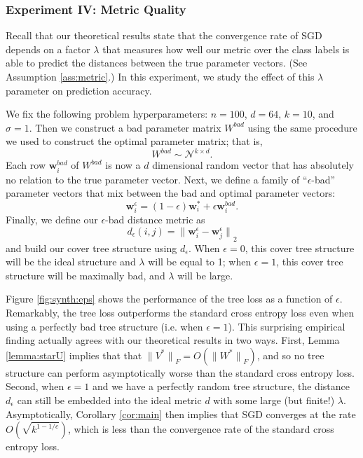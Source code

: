 \documentclass[twoside]{article}
\renewcommand{\star}[1]{{#1}^{*}}
\newcommand{\bad}[1]{{#1}^{\textit{bad}}}
\newcommand{\w}{\mathbf w}
\newcommand{\ltwo}[1]{{\lVert {#1} \rVert}_2}
\newcommand{\lF}[1]{{\lVert {#1} \rVert}_F}
\begin{document}
\subsubsection{Experiment IV: Metric Quality}
\label{sec:synth:eps}

Recall that our theoretical results state that the convergence rate of SGD depends on a factor $\lambda$ that measures how well our metric over the class labels is able to predict the distances between the true parameter vectors.
(See Assumption \ref{ass:metric}.)
In this experiment, we study the effect of this $\lambda$ parameter on prediction accuracy.

We fix the following problem hyperparameters:
$n=100$, $d=64$, $k=10$, and $\sigma=1$.
Then we construct a bad parameter matrix $\bad W$ using the same procedure we used to construct the optimal parameter matrix;
that is,
\begin{equation}
    \bad W \sim \mathcal N ^ {k\times d}
    .
\end{equation}
Each row $\bad \w_i$ of $\bad W$ is now a $d$ dimensional random vector that has absolutely no relation to the true parameter vector.
Next, we define a family of ``$\epsilon$-bad'' parameter vectors that mix between the bad and optimal parameter vectors:
\begin{equation}
    \w^\epsilon_i = (1-\epsilon) \w^*_i + \epsilon \bad\w_i.
\end{equation}
Finally, we define our $\epsilon$-bad distance metric as
\begin{equation}
    d_\epsilon(i,j) = \ltwo{\w_i^\epsilon - \w_j^\epsilon}
\end{equation}
and build our cover tree structure using $d_\epsilon$.
When $\epsilon=0$, this cover tree structure will be the ideal structure and $\lambda$ will be equal to 1;
when $\epsilon=1$, this cover tree structure will be maximally bad, and $\lambda$ will be large.

Figure \ref{fig:synth:eps} shows the performance of the tree loss as a function of $\epsilon$.
Remarkably, the tree loss outperforms the standard cross entropy loss even when using a perfectly bad tree structure (i.e. when $\epsilon=1$).
This surprising empirical finding actually agrees with our theoretical results in two ways.
First, Lemma \ref{lemma:starU} implies that that $\lF{\star V} = O(\lF{\star W})$,
and so no tree structure can perform asymptotically worse than the standard cross entropy loss.
Second, when $\epsilon=1$ and we have a perfectly random tree structure,
the distance $d_\epsilon$ can still be embedded into the ideal metric $d$ with some large (but finite!) $\lambda$.
Asymptotically, Corollary \ref{cor:main} then implies that SGD converges at the rate $O(\sqrt{k^{1-1/c}})$,
which is less than the convergence rate of the standard cross entropy loss.
\end{document}
